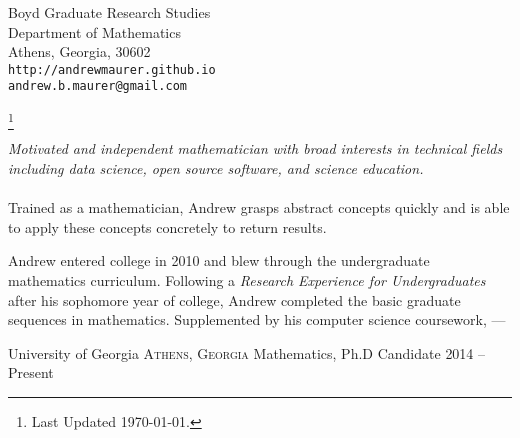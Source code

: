 \documentclass[10pt,a4paper]{article}
\newcommand\blfootnote[1]{%
  \begingroup
  \renewcommand\thefootnote{}\footnote{#1}%
  \addtocounter{footnote}{-1}%
  \endgroup
}
\begin{document}
\sloppy  %



\spacedhrule{0.9em}{-0.4em}  %

\vspace{-1.3em}
\begin{multicols}{2}
\noindent
Boyd Graduate Research Studies\\
Department of Mathematics\\
Athens, Georgia, 30602 \\
\texttt{http://andrewmaurer.github.io} \\
\texttt{andrew.b.maurer@gmail.com}
\end{multicols}
\blfootnote{Last Updated \today.}

\spacedhrule{0em}{-0.4em}


\vspace{-1.3em}  %
\begin{multicols}{2}  %
\noindent \emph{Motivated and independent mathematician with broad interests in technical fields including data science, open source software, and science education.}
\\
\\
Trained as a mathematician, Andrew grasps abstract concepts quickly and is able to apply these concepts concretely to return results.

Andrew entered college in 2010 and blew through the undergraduate mathematics curriculum. Following a \emph{Research Experience for Undergraduates} after his sophomore year of college, Andrew completed the basic graduate sequences in mathematics. Supplemented by his computer science coursework, ---

\end{multicols}

\spacedhrule{0em}{-.04em}


\headedsection
  {University of Georgia}
  {\textsc{Athens, Georgia}} {%
  \headedsubsection
    {Mathematics, Ph.D Candidate}
    {2014 -- Present}
    {}
}
\end{document}
